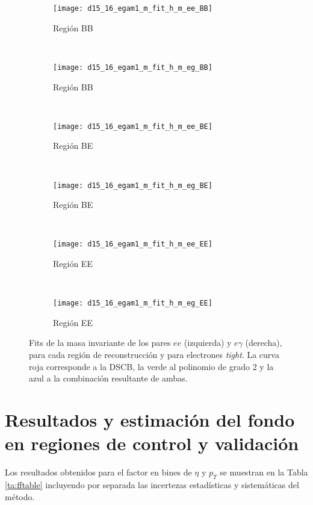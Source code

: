\begin{figure}

	\begin{subfigure}{0.5\textwidth}
		\texttt{[image: d15\_16\_egam1\_m\_fit\_h\_m\_ee\_BB]} 
		\caption{Región BB}
	\end{subfigure}
	~
	\begin{subfigure}{0.5\textwidth}
		\texttt{[image: d15\_16\_egam1\_m\_fit\_h\_m\_eg\_BB]}
		\caption{Región BB}
	\end{subfigure}
	~
	\begin{subfigure}{0.5\textwidth}
		\texttt{[image: d15\_16\_egam1\_m\_fit\_h\_m\_ee\_BE]} 
		\caption{Región BE}
	\end{subfigure}
	~
	\begin{subfigure}{0.5\textwidth}
		\texttt{[image: d15\_16\_egam1\_m\_fit\_h\_m\_eg\_BE]}
		\caption{Región BE}
	\end{subfigure}
	~
	\begin{subfigure}{0.5\textwidth}
		\texttt{[image: d15\_16\_egam1\_m\_fit\_h\_m\_ee\_EE]} 
		\caption{Región EE}
	\end{subfigure}
	~
	\begin{subfigure}{0.5\textwidth}
		\texttt{[image: d15\_16\_egam1\_m\_fit\_h\_m\_eg\_EE]}
		\caption{Región EE}
	\end{subfigure}

	\caption{Fits de la masa invariante de los pares $ee$ (izquierda) y $e\gamma$ (derecha), para cada región de reconstrucción y para electrones \textit{tight}. La curva roja corresponde a la DSCB, la verde al polinomio de grado 2 y la azul a la combinación resultante de ambas.}
\label{fits_invmass_tight}
\end{figure}




\section{Resultados y estimación del fondo en regiones de control y validación} \label{sec:resultados}


Los resultados obtenidos para el factor en bines de $\eta$ y $p_{T}$ se muestran en la Tabla \ref{ta:fftable} incluyendo por separada las incertezas estadísticas y sistemáticas del método.


